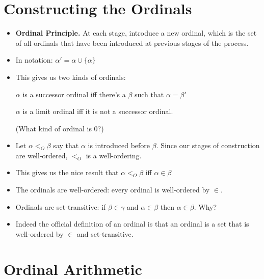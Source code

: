 \documentclass[justified]{tufte-handout}
\begin{document}
\section{Constructing the Ordinals}


\begin{itemize}


\item \textbf{Ordinal Principle.} At each stage, introduce a new ordinal, which is the set of all ordinals
that have been introduced at previous stages of the process.

\item In notation: $\alpha' = \alpha \cup \{\alpha\}$


\item This gives us two kinds of ordinals: 

$\alpha$ is a successor ordinal iff there's a $\beta$ such that $\alpha =\beta'$

$\alpha$ is a limit ordinal iff it is not a successor ordinal. 

(What kind of ordinal is 0?)


\item Let $\alpha <_O\beta$ say that $\alpha$ is introduced before $\beta$. Since our stages of construction are well-ordered, $<_O$ is a well-ordering.



\item This gives us the nice result that $\alpha <_O \beta$ iff $\alpha \in \beta$



\item The ordinals are well-ordered: every ordinal is well-ordered by $\in$.



\item Ordinals are set-transitive: if $\beta \in\gamma$ and $\alpha\in\beta$ then $\alpha \in\beta$. Why?


\item Indeed the official definition of an ordinal is that an ordinal is a set that is well-ordered by $\in$ and set-transitive.

\end{itemize}


\section{Ordinal Arithmetic} 
\end{document}
